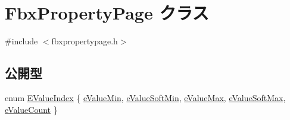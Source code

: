 \hypertarget{class_fbx_property_page}{}\section{Fbx\+Property\+Page クラス}
\label{class_fbx_property_page}


{\ttfamily \#include $<$fbxpropertypage.\+h$>$}

\subsection*{公開型}
\begin{DoxyCompactItemize}
\item 
enum \hyperlink{class_fbx_property_page_a056448778e0c4902bf32c07188d79097}{E\+Value\+Index} \{ \newline
\hyperlink{class_fbx_property_page_a056448778e0c4902bf32c07188d79097aefed9b1915a894d4ff07ca167c840ccf}{e\+Value\+Min}, 
\hyperlink{class_fbx_property_page_a056448778e0c4902bf32c07188d79097a7e85ba827c1ed0301dcfb38808a5d555}{e\+Value\+Soft\+Min}, 
\hyperlink{class_fbx_property_page_a056448778e0c4902bf32c07188d79097ae80598db28c9e316731b00105599900d}{e\+Value\+Max}, 
\hyperlink{class_fbx_property_page_a056448778e0c4902bf32c07188d79097a66369d9071fc3ce4d45fc50ab0bfb942}{e\+Value\+Soft\+Max}, 
\newline
\hyperlink{class_fbx_property_page_a056448778e0c4902bf32c07188d79097a0d7863d70b1f67b3361a0638d1c7376b}{e\+Value\+Count}
 \}
\end{DoxyCompactItemize}
